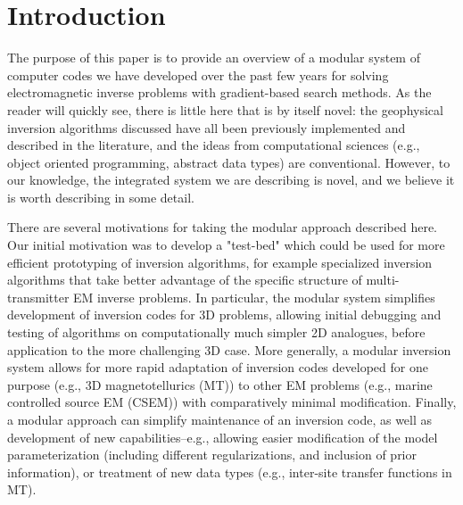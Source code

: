 \section{Introduction}

The purpose of this paper is to provide an overview
of a modular system of computer codes we have developed over
the past few years for solving electromagnetic inverse problems
with gradient-based search methods.
As the reader will quickly see, there is little here that
is by itself novel: the geophysical inversion algorithms discussed
have all been previously implemented and described in
the literature, and the ideas from computational sciences
(e.g., object oriented programming, abstract data types)
are conventional.  However, to our knowledge, the integrated
system we are describing is novel, and we believe it
is worth describing in some detail.

There are several motivations for taking the modular 
approach described here.  Our initial motivation
was to develop a "test-bed" which could be used for 
more efficient prototyping of inversion algorithms,
for example specialized inversion algorithms that
take better advantage of the specific structure of 
multi-transmitter EM inverse problems.
In particular, the modular system simplifies
development of inversion codes for 3D problems,
allowing initial debugging and testing of algorithms
on computationally much simpler 2D analogues, before application
to the more challenging 3D case.
More generally, a modular inversion system
allows for more rapid adaptation of inversion codes developed
for one purpose (e.g., 3D magnetotellurics (MT)) to other EM problems
(e.g., marine controlled source EM (CSEM))
with comparatively minimal modification.
Finally, a modular approach can simplify
maintenance of an inversion code, as
well as development of new capabilities--e.g., allowing easier
modification of the model parameterization
(including different regularizations, and inclusion of prior
information), or treatment of new data types (e.g., inter-site
transfer functions in MT).

